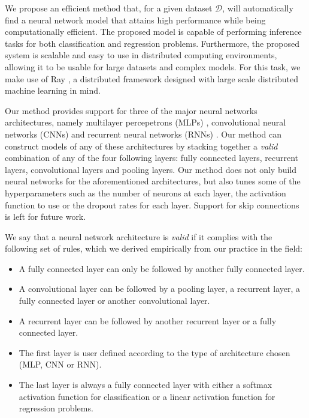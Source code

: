 \documentclass[12pt]{elsart}%
\begin{document}
We propose an efficient method that, for a given dataset $\mathcal{D}$, will automatically find a neural network model that attains high performance while being computationally efficient. The proposed model is capable of performing inference tasks for both classification and regression problems. Furthermore, the proposed system is scalable and easy to use in distributed computing environments, allowing it to be usable for large datasets and complex models. For this task, we make use of Ray \cite{Moritz2017}, a distributed framework designed with large scale distributed machine learning in mind.

Our method provides support for three of the major neural networks architectures, namely multilayer percepetrons (MLPs) \cite{Engelbrecht2007}, convolutional neural networks (CNNs) \cite{imagenet_cvpr09} and recurrent neural networks (RNNs) \cite{dblp_lipton_2015}. Our method can construct models of any of these architectures by stacking together a \textit{valid} combination of any of the four following layers: fully connected layers, recurrent layers, convolutional layers and pooling layers. Our method does not only build neural networks for the aforementioned architectures, but also tunes some of the hyperparameters such as the number of neurons at each layer, the activation function to use or the dropout rates for each layer. Support for skip connections is left for future work.

We say that a neural network architecture is \textit{valid} if it complies with the following set of rules, which we derived empirically from our practice in the field:

\begin{itemize}
\item A fully connected layer can only be followed by another fully connected layer.
\item A convolutional layer can be followed by a pooling layer, a recurrent layer, a fully connected layer or another convolutional layer.
\item A recurrent layer can be followed by another recurrent layer or a fully connected layer.
\item The first layer is user defined according to the type of architecture chosen (MLP, CNN or RNN).
\item The last layer is always a fully connected layer with either a softmax activation function for classification or a linear activation function for regression problems.
\end{itemize}
\end{document}
